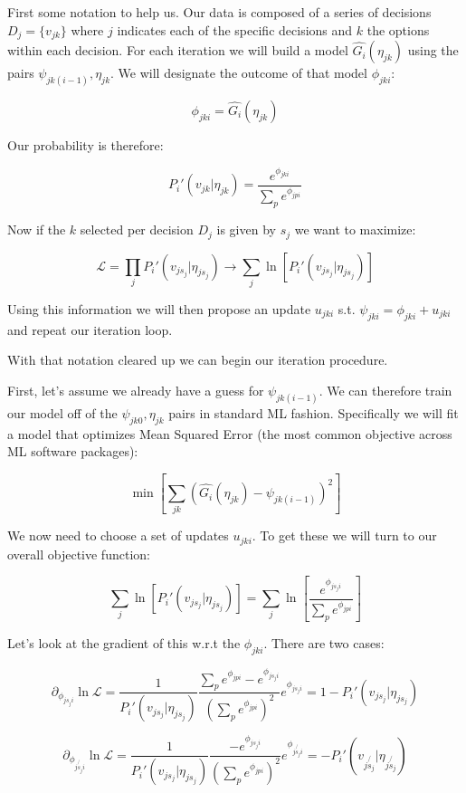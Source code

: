 \documentclass[11pt]{article}
\begin{document}
First some notation to help us. Our data is composed of a series of decisions $D_j=\lbrace v_{jk} \rbrace$ where $j$ indicates each of the specific decisions and $k$ the options within each decision. For each iteration we will build a model $\hat{G_i}(\eta_{jk})$ using the pairs $\psi_{jk(i-1)},\eta_{jk}$. We will designate the outcome of that model $\phi_{jki}$:

$$\phi_{jki} = \hat{G_i}(\eta_{jk})$$

Our probability is therefore:

$$P_i'(v_{jk}|\eta_{jk})=\frac{e^{\phi_{jki}}}{\sum_p e^{\phi_{jpi}}}$$

Now if the $k$ selected per decision $D_j$ is given by $s_j$ we want to maximize:

$$\mathcal{L}=\prod_j P_i'(v_{js_j} | \eta_{js_j})\rightarrow \sum_j \ln{\left[ P_i'(v_{js_j} | \eta_{js_j}) \right]}$$

Using this information we will then propose an update $u_{jki}$ s.t. $\psi_{jki}=\phi_{jki} + u_{jki}$ and repeat our iteration loop. 

With that notation cleared up we can begin our iteration procedure. \newline

First, let's assume we already have a guess for $\psi_{jk(i-1)}$. We can therefore train our model off of the $\psi_{jk0},\eta_{jk}$ pairs in standard ML fashion. Specifically we will fit a model that optimizes Mean Squared Error (the most common objective across ML software packages):

$$\min{\left[ \sum_{jk}\left(\hat{G_i}(\eta_{jk}) - \psi_{jk(i-1)}\right)^2 \right]}$$

We now need to choose a set of updates $u_{jki}$. To get these we will turn to our overall objective function:

$$\sum_j \ln{\left[ P_i'(v_{js_j} | \eta_{js_j}) \right]}= \sum_j \ln{\left[ \frac{e^{\phi_{js_ji}}}{\sum_p e^{\phi_{jpi}}} \right]}$$

Let's look at the gradient of this w.r.t the $\phi_{jki}$. There are two cases:

$$\partial_{\phi_{js_ji}}\ln{\mathcal{L}}
=
\frac{1}{P_i'(v_{js_j} | \eta_{js_j})}\frac{\sum_p e^{\phi_{jpi}}-e^{\phi_{js_ji}}}{\left( \sum_p e^{\phi_{jpi}} \right)^2} e^{\phi_{js_ji}}
=
1-P_i'(v_{js_j} | \eta_{js_j}) $$ 

$$\partial_{\phi_{j\not{s_j}i}}\ln{\mathcal{L}}
=
\frac{1}{P_i'(v_{js_j} | \eta_{js_j})}\frac{-e^{\phi_{js_ji}}}{\left( \sum_p e^{\phi_{jpi}} \right)^2} e^{\phi_{j\not{s_j}i}}
= 
-P_i'(v_{j\not{s_j}} | \eta_{j\not{s_j}})$$ 
\end{document}
